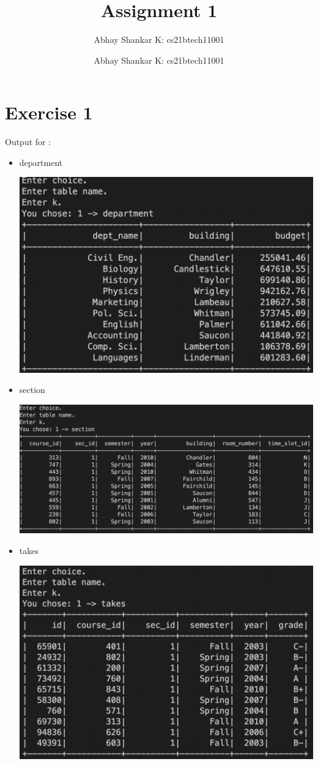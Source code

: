 \documentclass[12pt]{amsart}
\author{Abhay Shankar K: cs21btech11001}
\newcommand{\me}{
    \author{Abhay Shankar K: cs21btech11001}
    \maketitle
}
\begin{document}
\title{Assignment 1}
\me

    \section*{Exercise 1}
    Output for : \begin{itemize}
        \item department
    
        \includegraphics[scale = 0.5]{1_1.png}
    
        \item section 
    
        \includegraphics[scale = 0.5]{1_2.png}
    
        \item takes

        \includegraphics[scale = 0.5]{1_3.png}
    
    \end{itemize}
    
\end{document}
